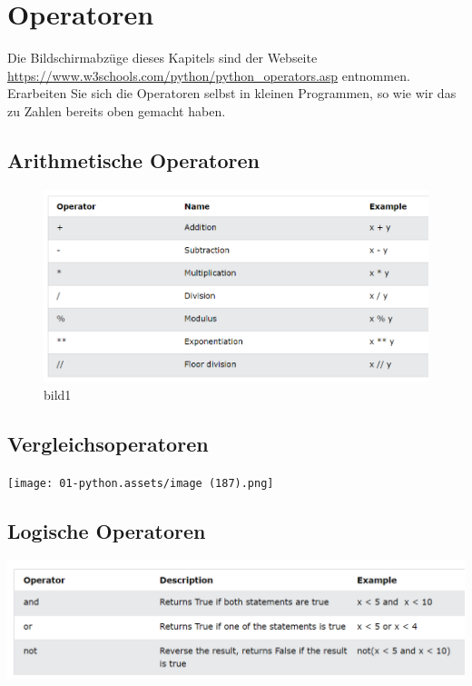\documentclass[
  oneside]{book}
\begin{document}
\hypertarget{operatoren}{%
\section{Operatoren}\label{operatoren}}

Die Bildschirmabzüge dieses Kapitels sind der Webseite \url{https://www.w3schools.com/python/python_operators.asp} entnommen. Erarbeiten Sie sich die Operatoren selbst in kleinen Programmen, so wie wir das zu Zahlen bereits oben gemacht haben.

\hypertarget{arithmetische-operatoren}{%
\subsection{Arithmetische Operatoren}\label{arithmetische-operatoren}}

\begin{figure}
\centering
\includegraphics{assets/python.assets/bild1.png}
\caption{bild1}
\end{figure}

\hypertarget{vergleichsoperatoren}{%
\subsection{Vergleichsoperatoren}\label{vergleichsoperatoren}}

\texttt{[image: 01-python.assets/image (187).png]}

\hypertarget{logische-operatoren}{%
\subsection{Logische Operatoren}\label{logische-operatoren}}

\includegraphics{assets/python.assets/image (188).png}
\end{document}
